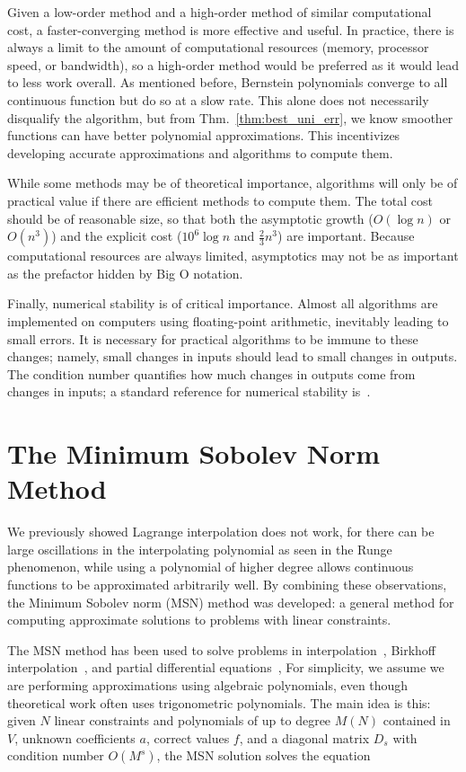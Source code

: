 Given a low-order method and a high-order method of similar computational cost,
a faster-converging method is more effective and useful.
In practice, there is always a limit to the amount of computational
resources (memory, processor speed, or bandwidth), so a high-order
method would be preferred as it would lead to less work overall.
As mentioned before, Bernstein polynomials converge to all
continuous function but do so at a slow rate. This alone does not
necessarily disqualify the algorithm, but from Thm.~\ref{thm:best_uni_err},
we know smoother functions can have better polynomial
approximations. This incentivizes developing accurate approximations
and algorithms to compute them.

While some methods may be of theoretical importance, algorithms will only
be of practical value if there are efficient methods to compute them.
The total cost should be of reasonable size, so that both the 
asymptotic growth ($O(\log n)$ or $O(n^{3})$) and
the explicit cost ($10^{6}\log n$ and $\frac{2}{3}n^{3}$) are important.
Because computational resources are always limited, asymptotics
may not be as important as the prefactor hidden by Big O notation.

Finally, numerical stability is of critical importance.
Almost all algorithms are implemented on computers using
floating-point arithmetic, inevitably leading to small errors.
It is necessary for practical algorithms to be immune to these
changes; namely, small changes in inputs should lead to small changes
in outputs.
The condition number quantifies how much changes in outputs come
from changes in inputs; a standard reference for numerical stability
is~\cite{HighamASNA}.



\section{The Minimum Sobolev Norm Method}
\label{sec:msn_intro}

We previously showed Lagrange interpolation
does not work, for there can be large oscillations in the interpolating
polynomial as seen in the Runge phenomenon, while using a polynomial
of higher degree allows continuous functions to be approximated
arbitrarily well.
By combining these observations, the 
Minimum Sobolev norm (MSN) method was developed: a general
method for computing approximate solutions to problems
with linear constraints.

The MSN method has been used to solve problems in
interpolation~\cite{msnInterp},
Birkhoff interpolation~\cite{msnBirkhoff}, and
partial differential equations~\cite{msnPDE},
For simplicity,
we assume we are performing approximations using algebraic polynomials,
even though theoretical work often uses trigonometric polynomials.
The main idea is this: given $N$ linear constraints and polynomials
of up to degree $M(N)$ contained in $V$, unknown coefficients $a$,
correct values $f$, and a diagonal matrix $D_{s}$ with
condition number $O(M^{s})$, the MSN solution solves the equation

